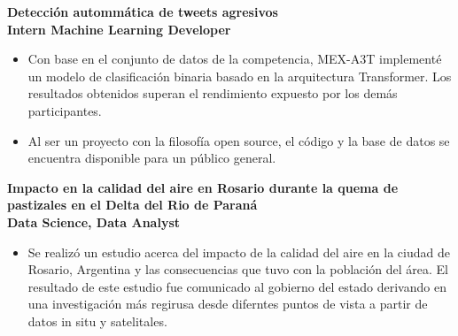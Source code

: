 \documentclass[a3paper]{adcv_color}
\newcommand{\proyect}[2]{
\textbf{#2}\\
{\color{linktext}	\textbf {#1}}
\vspace{-1cm}\\
}
\begin{document}
\proyect{Intern Machine Learning Developer}{Detección autommática de tweets agresivos}
\begin{itemize}
	\setlength\itemsep{0em}
	\item Con base en el conjunto de datos de la competencia, MEX-A3T implementé un modelo de clasificación binaria basado en la arquitectura Transformer. Los resultados obtenidos superan el rendimiento expuesto por los demás participantes.
	\item  Al ser un proyecto con la filosofía open source, el código y la base de datos se encuentra disponible para un público general.
\end{itemize}



\proyect{Data Science, Data Analyst}{Impacto en la calidad del aire en Rosario durante la quema de pastizales en el Delta del Rio de Paraná}
\begin{itemize}
	\item Se realizó un estudio acerca del impacto de la calidad del aire en la ciudad de Rosario, Argentina y las consecuencias que tuvo con la población del área. El resultado de este estudio fue comunicado al gobierno del estado derivando en una investigación más regirusa desde diferntes puntos de vista a partir de datos in situ y satelitales.
\end{itemize}
\end{document}

